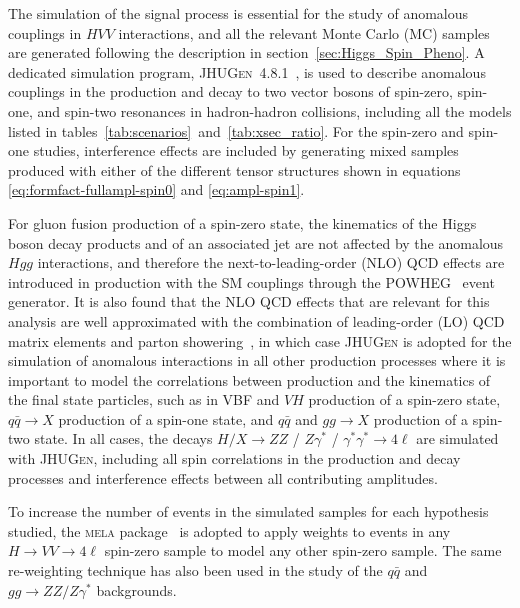 The simulation of the signal process is essential for the study of anomalous couplings in $HVV$ interactions, and all the relevant Monte Carlo (MC) samples are generated following the description in section~\ref{sec:Higgs_Spin_Pheno}. A dedicated simulation program, \textsc{JHUGen}~4.8.1~\cite{Gao:2010qx,Bolognesi:2012mm,Anderson:2013afp}, is used to describe anomalous couplings in the production and decay to two vector bosons of spin-zero, spin-one, and spin-two resonances in hadron-hadron collisions, including all the models listed in tables~\ref{tab:scenarios}~and~\ref{tab:xsec_ratio}. For the spin-zero and spin-one studies, interference effects are included by generating mixed samples produced with either of the different tensor structures shown in equations \eqref{eq:formfact-fullampl-spin0} and \eqref{eq:ampl-spin1}.


For gluon fusion production of a spin-zero state, the kinematics of the Higgs boson decay products and of an associated jet are not affected by the anomalous $Hgg$ interactions, and therefore the next-to-leading-order (NLO) QCD effects are introduced in production with the SM couplings through the \textsc{POWHEG}~\cite{Frixione:2007vw,Bagnaschi:2011tu,Nason:2009ai} event generator. It is also found that the NLO QCD effects that are relevant for this analysis are well approximated with the combination of leading-order (LO) QCD matrix elements and parton showering~\cite{Anderson:2013afp}, in which case \textsc{JHUGen} is adopted for the simulation of anomalous interactions in all other production processes where it is important to model the correlations between production and the kinematics of the final state particles, such as in VBF and $VH$ production of a spin-zero state, $q\bar{q} \to X$ production of a spin-one state, and $q\bar{q}$ and $gg \to X$ production of a spin-two state. In all cases, the decays $H/X \to ZZ$ / $Z\gamma^*$ / $\gamma^*\gamma^*\to4\ell$ are simulated with \textsc{JHUGen}, including all spin correlations in the production and decay processes and interference effects between all contributing amplitudes.

To increase the number of events in the simulated samples for each hypothesis studied, the \textsc{mela} package~\cite{Chatrchyan:2012ufa,Gao:2010qx,Bolognesi:2012mm,Anderson:2013afp} is adopted to apply weights to events in any $H \to V V \to4\ell$ spin-zero sample to model any other spin-zero sample. The same re-weighting technique has also been used in the study of the $q\bar{q}$ and $gg \to ZZ/Z\gamma^*$ backgrounds.

